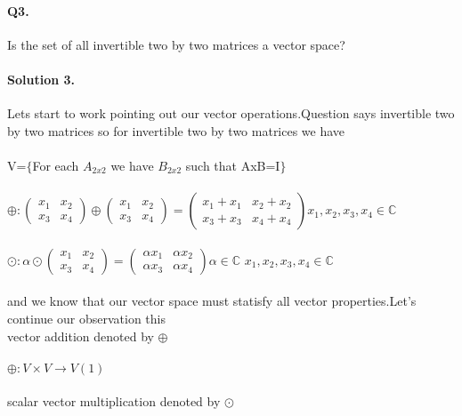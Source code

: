 \documentclass[11pt]{article}
\newcommand{\C}{\mathbb{C}}
\begin{document}
\paragraph{Q3.}Is the set of all invertible two by two matrices a vector space?
\paragraph{Solution 3.}Lets start to work pointing out our vector operations.Question says invertible two by two matrices so for invertible two by two matrices we have
\paragraph{}V=$\{$For each $A_{2x2}$ we have $B_{2x2}$ such that AxB=I$\}$
\paragraph{}
$\oplus :
\begin{pmatrix}
x_1&x_2\\
x_3&x_4
\end{pmatrix}
\oplus
\begin{pmatrix}
x_1&x_2\\
x_3&x_4
\end{pmatrix}
=
\begin{pmatrix}
x_1+x_1&x_2+x_2\\
x_3+x_3&x_4+x_4
\end{pmatrix}
x_1,x_2,x_3,x_4 \in \C
$ 
\paragraph{}
$
\odot :
\alpha
\odot
\begin{pmatrix}
x_1&x_2\\
x_3&x_4
\end{pmatrix}
=
\begin{pmatrix}
\alpha x_1& \alpha x_2\\
\alpha x_3& \alpha x_4
\end{pmatrix}
\alpha \in \C
$
$
x_1,x_2,x_3,x_4 \in \C
$
\paragraph{}and we know that our vector space must statisfy all vector properties.Let's continue our observation this
\\
vector addition denoted by $\oplus$
\paragraph{}$\oplus : V \times V \rightarrow V (1)$
\\
\\
scalar vector multiplication denoted by $\odot$
\end{document}
